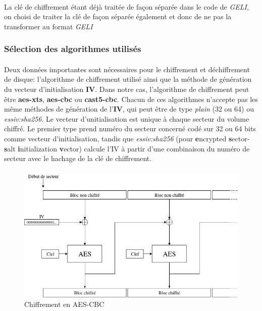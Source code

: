 \paragraph{}
La clé de chiffrement étant déjà traitée de façon séparée dans le code de 
{\em GELI}, on choisi de traiter la clé de façon séparée également et donc de 
ne pas la transformer au format {\em GELI}


\subsubsection{Sélection des algorithmes utilisés}
\paragraph{}
Deux données importantes sont nécessaires pour le chiffrement et déchiffrement
de disque: l'algorithme de chiffrement utilisé ainsi que la méthode de
génération du vecteur d'initialisation \textbf{IV}. Dans notre cas, l'algorithme
de chiffrement peut être \textbf{aes-xts}, \textbf{aes-cbc} ou
\textbf{cast5-cbc}. Chacun de ces algorithmes n'accepte pas les même méthodes de
génération de l'\textbf{IV}, qui peut être de type \textit{plain} (32 ou 64) ou
\textit{essiv:sha256}. Le vecteur d'unitialisation est unique à chaque secteur
du volume chiffré. Le premier type prend numéro du secteur concerné codé sur 32
ou 64 bits comme vecteur d'initialisation, tandis que \textit{essiv:sha256}
(pour \textbf{e}ncrypted \textbf{s}ector-\textbf{s}alt \textbf{i}nitialization
\textbf{v}ector) calcule l'IV à partir d'une combinaison du numéro de secteur
avec le hachage de la clé de chiffrement.
\paragraph{}
\begin{figure}[h]
\centering
\includegraphics[width=.9\linewidth]{choix_developpement/aes_cbc.png}
\caption{\label{fig:aes_cbc}Chiffrement en AES-CBC}
\end{figure}
